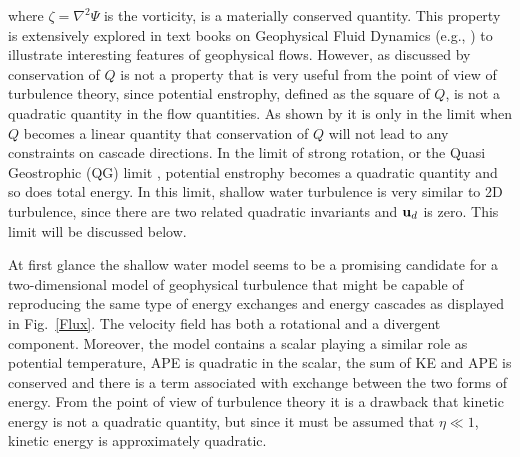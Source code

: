 where $ \zeta =  \nabla^{2} \Psi $ is the vorticity, is a materially conserved quantity.
This property is extensively explored in text books on Geophysical Fluid Dynamics (e.g., \citet{Vallis:book}) to illustrate interesting features of geophysical flows. { However, as discussed by \citet{Warn1986}  conservation of $ Q $ is not a property that is very useful from the point of view of turbulence theory, since potential enstrophy, defined as the square of $ Q $,  is not a quadratic quantity in the flow quantities.  As shown by \citet{Warn1986} it is only in the limit when $ Q $ becomes a linear quantity that
 conservation of $ Q $ will not lead to any constraints on cascade directions. }  In the limit of strong rotation, or the Quasi Geostrophic (QG) limit \citep{Charney1971}, potential enstrophy becomes a quadratic quantity and so does total energy.  In this limit,  shallow water turbulence is very similar to 2D turbulence, since there are two related quadratic invariants and $ {\bf u}_d $ is zero. This limit will be discussed below.

At first glance the shallow water model seems to be a promising candidate for a two-dimensional model of geophysical turbulence that might be capable of reproducing the same type of energy exchanges and energy cascades as displayed in Fig.~\ref{Flux}.
The velocity field has both a rotational and a divergent component. Moreover, the model contains a scalar playing a similar role as potential temperature, APE is quadratic in the scalar,
the sum of KE and APE is conserved and there is a term associated with exchange between the two forms of energy.  From the point of view of turbulence theory it is a drawback that kinetic energy is not a quadratic quantity, but since it must be assumed that $ \eta \ll 1 $, kinetic energy is approximately quadratic.

